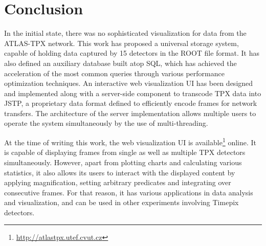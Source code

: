 \chapter{Conclusion}

In the initial state, there was no sophisticated visualization for data from the ATLAS-TPX network. This work has proposed a universal storage system, capable of holding data captured by 15 detectors in the ROOT file format. It has also defined an auxiliary database built atop SQL, which has achieved the acceleration of the most common queries through various performance optimization techniques. An interactive web visualization UI has been designed and implemented along with a server-side component to transcode TPX data into JSTP, a proprietary data format defined to efficiently encode frames for network transfers. The architecture of the server implementation allows multiple users to operate the system simultaneously by the use of multi-threading.

At the time of writing this work, the web visualization UI is available\footnote{\url{http://atlastpx.utef.cvut.cz}} online. It is capable of displaying frames from single as well as multiple TPX detectors simultaneously. However, apart from plotting charts and calculating various statistics, it also allows its users to interact with the displayed content by applying magnification, setting arbitrary predicates and integrating over consecutive frames. For that reason, it has various applications in data analysis and visualization, and can be used in other experiments involving Timepix detectors.

